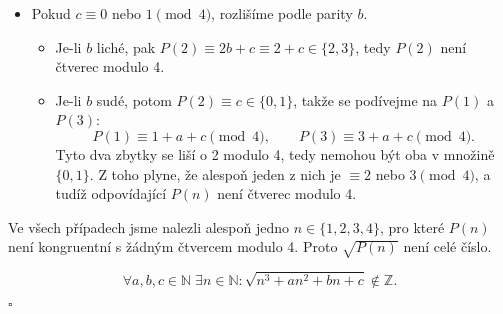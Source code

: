 \documentclass[12pt]{article}
\begin{document}
\begin{enumerate}
\begin{enumerate}
\begin{itemize}
              \item Pokud \(c \equiv 0\) nebo \(1 \pmod 4\), rozlišíme podle parity \(b\).
              \begin{itemize}
                \item Je-li \(b\) liché, pak \(P(2) \equiv 2b + c \equiv 2 + c \in \{2,3\}\),
                tedy \(P(2)\) není čtverec modulo 4.
                \item Je-li \(b\) sudé, potom \(P(2) \equiv c \in \{0,1\}\),
                takže se podívejme na \(P(1)\) a \(P(3)\):
                \[
                  P(1) \equiv 1 + a + c \pmod 4, \qquad
                  P(3) \equiv 3 + a + c \pmod 4.
                  \]
                  Tyto dva zbytky se liší o 2 modulo 4, tedy nemohou být oba v množině \(\{0,1\}\).
                  Z toho plyne, že alespoň jeden z nich je \(\equiv 2\) nebo \(3 \pmod 4\),
                  a tudíž odpovídající \(P(n)\) není čtverec modulo 4.
                \end{itemize}
              \end{itemize}
              
              \medskip
              Ve všech případech jsme nalezli alespoň jedno \(n \in \{1,2,3,4\}\),
              pro které \(P(n)\) není kongruentní s žádným čtvercem modulo 4.
              Proto \(\sqrt{P(n)}\) není celé číslo.
              
              \[
                \boxed{
                  \forall a,b,c \in \mathbb{N} \; \exists n \in \mathbb{N} :
                  \sqrt{n^3 + a n^2 + b n + c} \notin \mathbb{Z}.
                  }
                  \]
                  
                  \hfill\(\square\)
    \end{enumerate} 
  
\end{enumerate}
\end{document}
